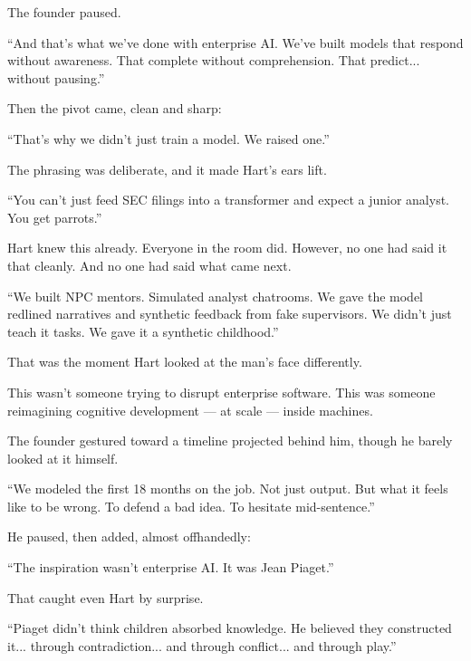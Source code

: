\medskip





The founder paused.

``And that’s what we’ve done with enterprise AI.
We’ve built models that respond without awareness.
That complete without comprehension.
That predict... without pausing.''

Then the pivot came, clean and sharp:

``That’s why we didn’t just train a model.
We raised one.''







The phrasing was deliberate, and it made Hart’s ears lift.

``You can’t just feed SEC filings into a transformer and expect a junior analyst. You get parrots.''

Hart knew this already. 
Everyone in the room did. 
However, no one had said it that cleanly. 
And no one had said what came next.

``We built NPC mentors. 
Simulated analyst chatrooms. 
We gave the model redlined narratives and synthetic feedback from fake supervisors. 
We didn’t just teach it tasks. 
We gave it a synthetic childhood.''

That was the moment Hart looked at the man’s face differently.

This wasn’t someone trying to disrupt enterprise software. 
This was someone reimagining cognitive development --- at scale --- inside machines.

The founder gestured toward a timeline projected behind him, though he barely looked at it himself.

``We modeled the first 18 months on the job. 
Not just output. 
But what it feels like to be wrong. 
To defend a bad idea. 
To hesitate mid-sentence.''

He paused, then added, almost offhandedly:

``The inspiration wasn’t enterprise AI. It was Jean Piaget.''

That caught even Hart by surprise.

``Piaget didn’t think children absorbed knowledge. 
He believed they constructed it... through contradiction... and through conflict... and through play.''

\medskip


